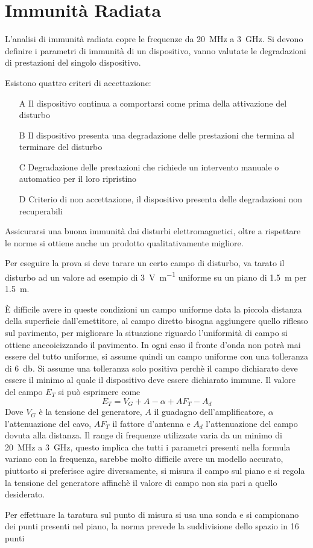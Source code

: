 
\section{Immunità Radiata}
L'analisi di immunità radiata copre le frequenze da \SI{20}{\mega\hertz} a \SI{3}{\giga\hertz}.
Si devono definire i parametri di immunità di un dispositivo, vanno valutate le degradazioni di prestazioni
del singolo dispositivo.

Esistono quattro criteri di accettazione:
\begin{itemize}
 \item [A] Il dispositivo continua a comportarsi come prima della attivazione del disturbo
 \item [B] Il dispositivo presenta una degradazione delle prestazioni che termina al terminare del disturbo 
 \item [C] Degradazione delle prestazioni che richiede un intervento manuale o automatico per il loro ripristino
 \item [D] Criterio di non accettazione, il dispositivo presenta delle degradazioni non recuperabili
\end{itemize}

Assicurarsi una buona immunità dai disturbi elettromagnetici, oltre a rispettare le norme si ottiene
anche un prodotto qualitativamente migliore.

Per eseguire la prova si deve tarare un certo campo di disturbo, va tarato il disturbo ad un valore
ad esempio di \SI[per-mode=symbol]{3}{\volt\per\meter} uniforme su un piano di \SI{1.5}{\meter} per \SI{1.5}{\meter}.

È difficile avere in queste condizioni un campo uniforme data la piccola distanza della superficie dall'emettitore,
al campo diretto bisogna aggiungere quello riflesso sul pavimento, per migliorare la situazione riguardo 
l'uniformità di campo si ottiene anecoicizzando il pavimento.
In ogni caso il fronte d'onda non potrà mai essere del tutto uniforme, si assume quindi un campo uniforme con una 
tolleranza di \SI{+6}{\decibel}. Si assume una tolleranza solo positiva perchè il campo dichiarato 
deve essere il minimo al quale il dispositivo deve essere dichiarato immune.
Il valore del campo $E_T$ si può esprimere come
$$
E_T = V_G + A - \alpha + AF_T -A_d
$$
Dove $V_G$ è la tensione del generatore, $A$ il guadagno dell'amplificatore, $\alpha$ l'attenuazione
del cavo, $AF_T$ il fattore d'antenna e $A_d$ l'attenuazione del campo dovuta alla distanza.
Il range di frequenze utilizzate varia da un minimo di \SI{20}{\mega\hertz} a \SI{3}{\giga\hertz},
questo implica che tutti i parametri presenti nella formula variano con la frequenza, sarebbe molto difficile
avere un modello accurato, piuttosto si preferisce agire diversamente, si misura il campo
sul piano e si regola la tensione del generatore affinchè il valore di campo non sia 
pari a quello desiderato.

Per effettuare la taratura sul punto di misura si usa una sonda e si campionano dei punti presenti nel
piano, la norma prevede la suddivisione dello spazio in 16 punti

